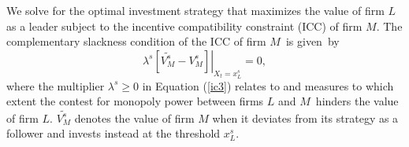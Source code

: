 \documentclass[nogrid,nosurname,sort&compress]{RFS}
\begin{document}

We solve for the optimal investment strategy that maximizes the value of firm $L$ as a leader
subject to the incentive compatibility constraint (ICC) of firm $M$. The complementary slackness
condition of the ICC of firm $M$\
is given~by%
\begin{equation}
\lambda ^{s}\left. \left[ \widetilde{V_{M}^{s}}-V_{M}^{s}\right] \right\vert
_{X_{t}=x_{L}^{s}}=0,  \label{ic3}
\end{equation}%
where the multiplier $\lambda ^{s}\geq 0$ in Equation (\ref{ic3}) relates to \cite{posner} and
measures to which extent the contest for monopoly power between firms $L$ and $M$\ hinders the
value of firm $L$. $\widetilde{V_{M}^{s}}$ denotes the value of firm $M$ when it deviates from its
strategy as a follower and invests instead at the threshold $x_{L}^{s}$. %
\end{document}
